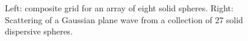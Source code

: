 {\begin{figure}[htb]
\begin{center}
{
}%
\end{center}
\caption{
  Left: composite grid for an array of eight solid spheres. 
  Right: Scattering of a Gaussian plane wave from a collection of 27 solid dispersive spheres.
}
  \label{fig:solidSphereArray}
\end{figure}
}
